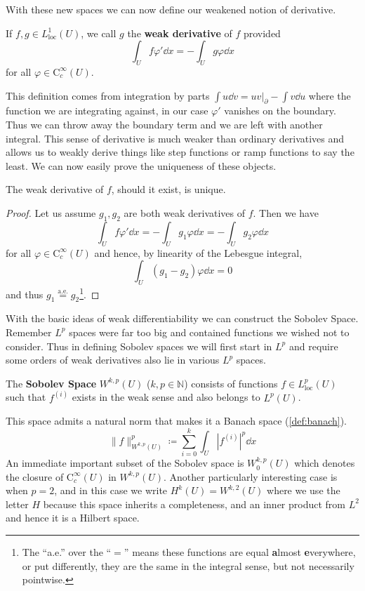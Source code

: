 With these new spaces we can now define our weakened notion of derivative.
\begin{definition}
If $f,g \in L^1_\mathrm{loc}(U)$, we call $g$ the \textbf{weak derivative} of $f$ provided
\begin{equation}
\int_U f\varphi'\dd{x} = -\int_Ug\varphi\dd{x}
\end{equation}
for all $\varphi\in\mathrm{C}_c^\infty(U)$.
\end{definition}
This definition comes from integration by parts $\int u\dd{v} = uv|_\partial - \int v\dd{u}$ where the function we are integrating against, in our case $\varphi'$ vanishes on the boundary. Thus we can throw away the boundary term and we are left with another integral. This sense of derivative is much weaker than ordinary derivatives and allows us to weakly derive things like step functions or ramp functions to say the least. We can now easily prove the uniqueness of these objects.
\begin{lemma}
The weak derivative of $f$, should it exist, is unique.
\end{lemma}
\begin{proof}
Let us assume $g_1, g_2$ are both weak derivatives of $f$. Then we have
\begin{equation}
\int_U f\varphi'\dd{x} = -\int_U g_1\varphi\dd{x} = -\int_U g_2\varphi\dd{x}
\end{equation}
for all $\varphi\in \mathrm{C}_c^\infty(U)$ and hence, by linearity of the Lebesgue integral,
\begin{equation}
\int_U\left(g_1 - g_2\right)\varphi\dd{x} = 0
\end{equation}
and thus $g_1\overset{\text{a.e.}}{=}g_2$\footnote{The ``a.e.'' over the ``$=$'' means these functions are equal \textbf{a}lmost \textbf{e}verywhere, or put differently, they are the same in the integral sense, but not necessarily pointwise.}.
\end{proof}

With the basic ideas of weak differentiability we can construct the Sobolev Space. Remember $L^p$ spaces were far too big and contained functions we wished not to consider. Thus in defining Sobolev spaces we will first start in $L^p$ and require some orders of weak derivatives also lie in various $L^p$ spaces.
\begin{definition}
The \textbf{Sobolev Space} $W^{k,p}(U)$ ($k,p\in\mathbb{N}$) consists of functions $f\in L^p_\mathrm{loc}(U)$ such that $f^{(i)}$ exists in the weak sense and also belongs to $L^p(U)$.
\end{definition}
This space admits a natural norm that makes it a Banach space (\ref{def:banach}).
\begin{equation}
\|f\|_{W^{k,p}(U)}^p \coloneqq \sum_{i = 0}^k\int_U |f^{(i)}|^p\dd{x}
\end{equation}
An immediate important subset of the Sobolev space is $W^{k,p}_0(U)$ which denotes the closure of $\mathrm{C}^\infty_c(U)$ in $W^{k,p}(U)$. Another particularly interesting case is when $p = 2$, and in this case we write $H^k(U) = W^{k,2}(U)$ where we use the letter $H$ because this space inherits a completeness, and an inner product from $L^2$ and hence it is a Hilbert space.

